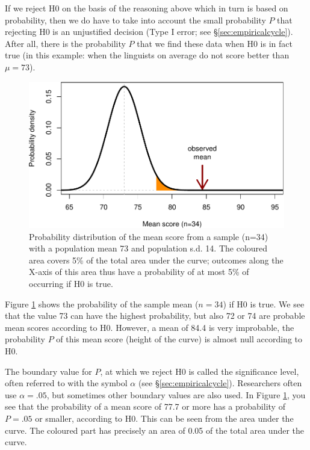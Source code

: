 \documentclass[
]{book}
\begin{document}
If we reject H0 on the basis of the reasoning above which in turn is
based on probability, then we do have to take into account the small
probability \(P\) that rejecting H0 is an unjustified decision (Type I error; see
§\ref{sec:empiricalcycle}). After all, there is the probability \(P\) that
we find these data when H0 is in fact true (in this example: when the linguists
on average do not score better than \(\mu=73\)).

\begin{figure}
\centering
\includegraphics{QMS-EN_files/figure-latex/gramm2013onesample-1.pdf}
\caption{\label{fig:gramm2013onesample}Probability distribution of the mean score from a sample (n=34) with a population mean 73 and population s.d. 14. The coloured area covers 5\% of the total area under the curve; outcomes along the X-axis of this area thus have a probability of at most 5\% of occurring if H0 is true.}
\end{figure}

Figure \ref{fig:gramm2013onesample} shows the probability of the
sample mean (\(n=34\)) if H0 is true. We see that the value 73 can have
the highest probability, but also 72 or 74 are probable mean scores
according to H0. However, a mean of 84.4 is very improbable, the probability
\(P\) of this mean score (height of the curve) is almost null according to
H0.

The boundary value for \(P\), at which we reject H0 is called the significance
level, often referred to with the symbol \(\alpha\) (see
§\ref{sec:empiricalcycle}). Researchers often use \(\alpha=.05\),
but sometimes other boundary values are also used. In Figure
\ref{fig:gramm2013onesample}, you see that the probability of a mean score
of 77.7 or more has a probability of \(P=.05\) or smaller, according to
H0. This can be seen from the area under the curve. The coloured part has
precisely an area of 0.05 of the total area under
the curve.
\end{document}
